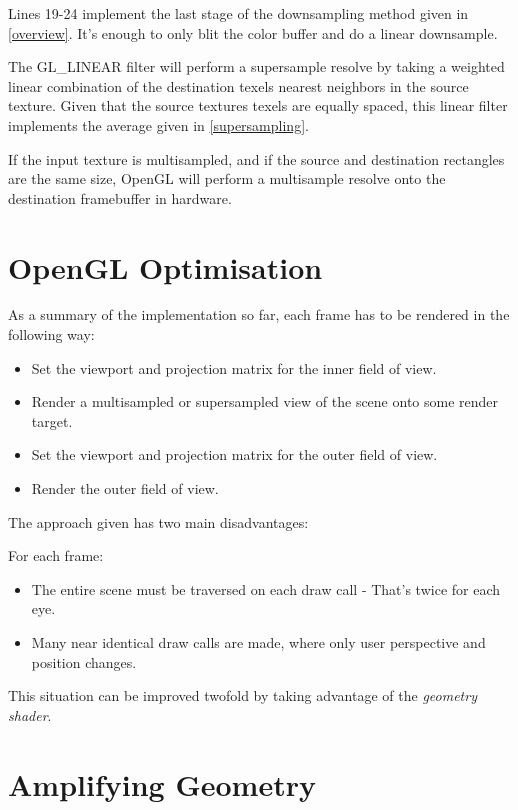 \documentclass[12pt,a4paper,twoside,openright]{report}
\begin{document}
Lines 19-24 implement the last stage of the downsampling method given in \ref{overview}. It's enough to only blit the color buffer and do a linear downsample. 

The GL\_LINEAR filter will perform a supersample resolve by taking a weighted linear combination of the destination texels nearest neighbors in the source texture. Given that the source textures texels are equally spaced, this linear filter implements the average given in \ref{supersampling}.

If the input texture is multisampled, and if the source and destination rectangles are the same size, OpenGL will perform a multisample resolve onto the destination framebuffer in hardware.

\section{OpenGL Optimisation} \label{optimisations}

As a summary of the implementation so far, each frame has to be rendered in the following way:

\begin{itemize}
  \item Set the viewport and projection matrix for the inner field of view.
  \item Render a multisampled or supersampled view of the scene onto some render target.
  \item Set the viewport and projection matrix for the outer field of view.
  \item Render the outer field of view.
\end{itemize}
The approach given has two main disadvantages:

For each frame:
\begin{itemize}
  \item The entire scene must be traversed on each draw call - That's twice for each eye.
  \item Many near identical draw calls are made, where only user perspective and position changes.
\end{itemize}

\noindent This situation can be improved twofold by taking advantage of the \emph{geometry shader}.

\section{Amplifying Geometry}
\end{document}
